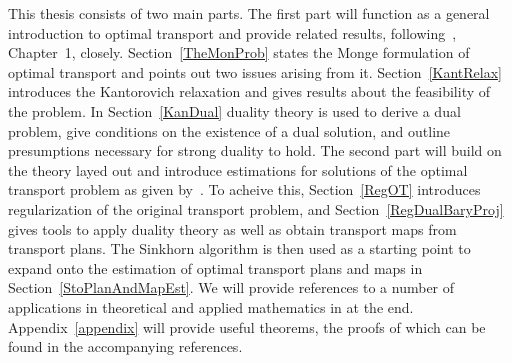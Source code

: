 This thesis consists of two main parts. The first part will function as a general introduction to optimal transport and provide related results, following\ \cite{San2015}, Chapter~1, closely. Section~\ref{TheMonProb} states the Monge formulation of optimal transport and points out two issues arising from it. Section~\ref{KantRelax} introduces the Kantorovich relaxation and gives results about the feasibility of the problem. In Section~\ref{KanDual} duality theory is used to derive a dual problem, give conditions on the existence of a dual solution, and outline presumptions necessary for strong duality to hold. The second part will build on the theory layed out and introduce estimations for solutions of the optimal transport problem as given by\ \cite{Seg2018}. To acheive this, Section~\ref{RegOT} introduces regularization of the original transport problem, and Section~\ref{RegDualBaryProj} gives tools to apply duality theory as well as obtain transport maps from transport plans. The Sinkhorn algorithm is then used as a starting point to expand onto the estimation of optimal transport plans and maps in Section~\ref{StoPlanAndMapEst}. We will provide references to a number of applications in theoretical and applied mathematics in at the end. Appendix~\ref{appendix} will provide useful theorems, the proofs of which can be found in the accompanying references.